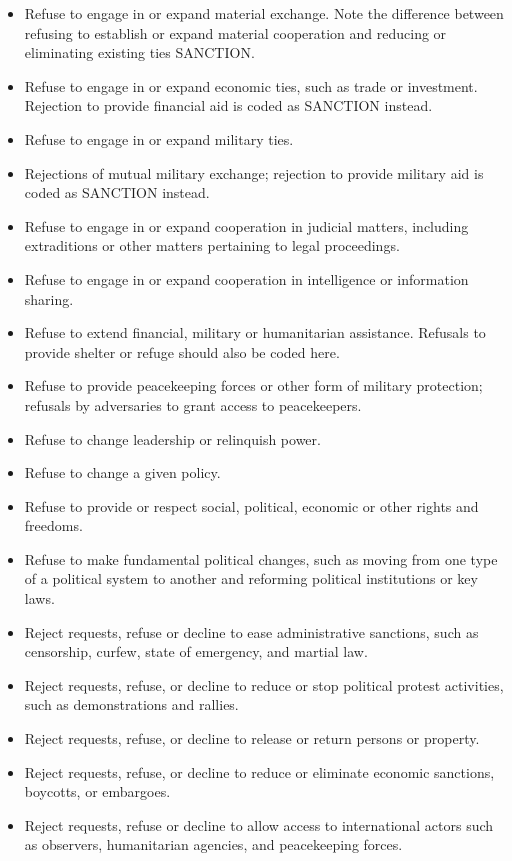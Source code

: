 \documentclass[11pt]{report}
\newcommand{\plcat}[1]{\textsf{#1}}
\begin{document}
\begin{itemize}

\item Refuse to engage in or expand material exchange. Note the difference between refusing to establish or expand material cooperation and reducing or eliminating existing ties \plcat{SANCTION}.
\item Refuse to engage in or expand economic ties, such as trade or investment. Rejection to provide financial aid is coded as \plcat{SANCTION} instead.
\item Refuse to engage in or expand military ties.
\item Rejections of mutual military exchange; rejection to provide military aid is coded as \plcat{SANCTION} instead.
\item Refuse to engage in or expand cooperation in judicial matters, including  extraditions or other matters pertaining to legal proceedings.
\item Refuse to engage in or expand cooperation in intelligence or information sharing.
\item Refuse to extend financial, military or humanitarian assistance. Refusals to provide shelter or refuge should also be coded here. 
\item Refuse to provide peacekeeping forces or other form of military protection; refusals by adversaries to grant access to peacekeepers.
\item Refuse to change leadership or relinquish power.
\item Refuse to change a given policy.
\item Refuse to provide or respect social, political, economic or other rights and freedoms.
\item Refuse to make fundamental political changes, such as moving from one type of a political system to another and reforming political institutions or key laws.
\item Reject requests, refuse or decline to ease administrative sanctions, such as censorship, curfew, state of emergency, and martial law.
\item Reject requests, refuse, or decline to reduce or stop political protest activities, such as demonstrations and rallies.
\item Reject requests, refuse, or decline to release or return persons or property.
\item Reject requests, refuse, or decline to reduce or eliminate economic sanctions, boycotts, or embargoes.
\item Reject requests, refuse or decline to allow access to international actors such as observers, humanitarian agencies, and peacekeeping forces.

\end{itemize}
\end{document}
